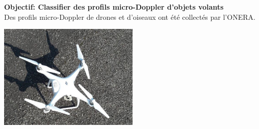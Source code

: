 \documentclass[a0,portrait]{a0poster}
\begin{document}
\vspace{1cm} %


\begin{multicols}{2} %


\begin{tcolorbox}[colback=blue!5!lime,colframe=green!75!black,title={\section*{Contexte}}]
\textbf{\Large{Objectif: Classifier des profils micro-Doppler d'objets volants}}\\
Des profils micro-Doppler de drones et d'oiseaux ont été collectés par l'ONERA.
\begin{center}
    \includegraphics[width=0.5\textwidth]{./Phantom_version1.jpg}
\end{center}
\end{tcolorbox}
\bigskip



\end{multicols}
\end{document}
